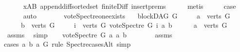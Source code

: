 \begin{isabellebody}
\ \ \ \ \isamarkupfalse%
\ xAB\ append{\isacharunderscore}{\kern0pt}diff{\isacharunderscore}{\kern0pt}sorted{\isacharunderscore}{\kern0pt}set\ finite{\isacharunderscore}{\kern0pt}Diff\ insert{\isachardot}{\kern0pt}prems{\isacharparenleft}{\kern0pt}{}{\isacharparenright}{\kern0pt}\isanewline
\ \ \ \ \isamarkupfalse%
\ metis\isanewline
\ \ \isamarkupfalse%
\ \isamarkupfalse%
\ {\isacharquery}{\kern0pt}case\isanewline
\ \ \ \ \isamarkupfalse%
\ auto\ \isanewline
\ \ \isamarkupfalse%
\isanewline
{}\isamarkupfalse%
%
\endisatagproof
{\isafoldproof}%
%
\isadelimproof
\ \ \isanewline
%
\endisadelimproof
\isanewline
\isanewline
\isanewline
{}\isamarkupfalse%
\ vote{\isacharunderscore}{\kern0pt}Spectre{\isacharunderscore}{\kern0pt}one{\isacharunderscore}{\kern0pt}exists{\isacharcolon}{\kern0pt}\isanewline
\ \ \ {\isachardoublequoteopen}blockDAG\ G{\isachardoublequoteclose}\isanewline
\ \ \ \ \ {\isachardoublequoteopen}a\ {\isasymin}\ verts\ G{\isachardoublequoteclose}\ \isanewline
\ \ \ \ \ {\isachardoublequoteopen}b\ {\isasymin}\ verts\ G{\isachardoublequoteclose}\ \isanewline
\ \ \ {\isachardoublequoteopen}{\isasymexists}\ i\ {\isasymin}\ verts\ G{\isachardot}{\kern0pt}\ vote{\isacharunderscore}{\kern0pt}Spectre\ G\ i\ a\ b\ {\isasymnoteq}\ {}{\isachardoublequoteclose}\isanewline
%
\isadelimproof
%
\endisadelimproof
%
\isatagproof
{}\isamarkupfalse%
\isanewline
\ \ \isamarkupfalse%
\ {\isachardoublequoteopen}a\ {\isasymin}\ verts\ G{\isachardoublequoteclose}\ \isamarkupfalse%
\ assms{\isacharparenleft}{\kern0pt}{}{\isacharparenright}{\kern0pt}\ \isamarkupfalse%
\ simp\isanewline
\ \ \isamarkupfalse%
\ {\isachardoublequoteopen}vote{\isacharunderscore}{\kern0pt}Spectre\ G\ a\ a\ b\ {\isasymnoteq}\ {}{\isachardoublequoteclose}\isanewline
\ \ \ \ \isamarkupfalse%
\ assms\isanewline
\ \ \isamarkupfalse%
{\isacharparenleft}{\kern0pt}cases\ a\ b\ a\ G\ rule{\isacharcolon}{\kern0pt}\ Spectre{\isacharunderscore}{\kern0pt}casesAlt{\isacharcomma}{\kern0pt}\ simp{\isacharplus}{\kern0pt}{\isacharparenright}{\kern0pt}\isanewline
\ \ \isamarkupfalse%
\isanewline
{}\isamarkupfalse%
%
\endisatagproof
{\isafoldproof}%
%
\isadelimproof
\isanewline
%
\endisadelimproof
%
\isadelimtheory
%
\endisadelimtheory
%
\isatagtheory
{}\isamarkupfalse%
%
\endisatagtheory
{\isafoldtheory}%
%
\isadelimtheory
%
\endisadelimtheory
%
\end{isabellebody}%
